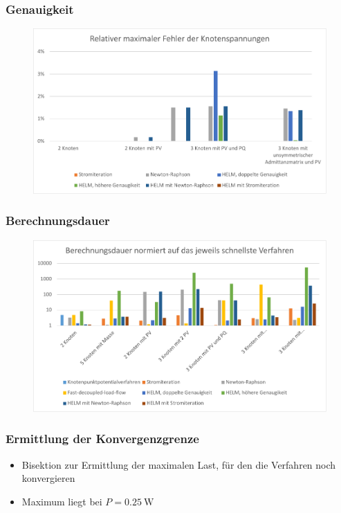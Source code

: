 \documentclass[hyperref={pdfpagelabels=false},compress]{beamer}
\begin{document}
\begin{frame}
	\frametitle{Genauigkeit}	
	\begin{figure}
		\centering
		\includegraphics[scale=0.6]{pictures/precision_2}
	\end{figure}
\end{frame}

\begin{frame}
	\frametitle{Berechnungsdauer}	
	\begin{figure}
		\centering
		\includegraphics[scale=0.6]{pictures/duration_mean}
	\end{figure}
\end{frame}

\begin{frame}
	\frametitle{Ermittlung der Konvergenzgrenze}	
	\begin{figure}
		\centering
		
	\end{figure}
	\begin{itemize}
		\item Bisektion zur Ermittlung der maximalen Last, für den die Verfahren noch konvergieren
		\item Maximum liegt bei $P = \SI{0.25}{\watt}$
	\end{itemize}
\end{frame}
\end{document}

